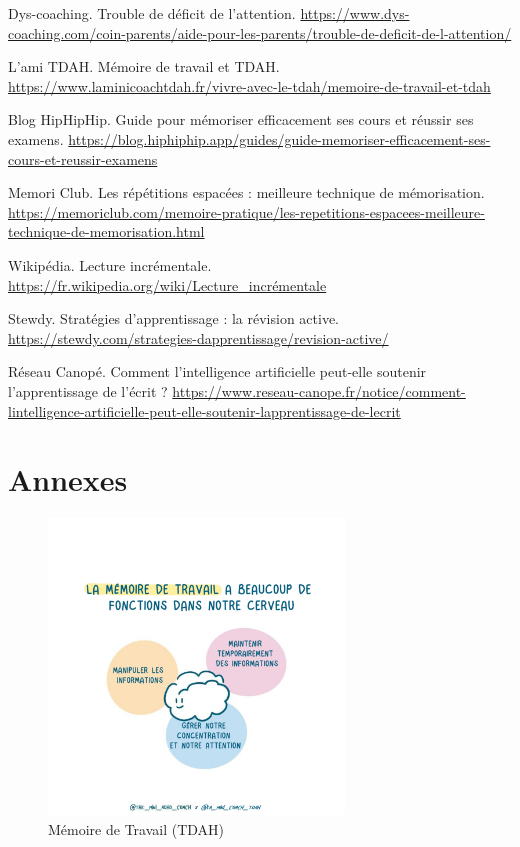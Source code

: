 \documentclass[11pt,a4paper]{report}
\begin{document}
\begin{thebibliography}{9}
        Dys-coaching. Trouble de déficit de l'attention. \break
        \url{https://www.dys-coaching.com/coin-parents/aide-pour-les-parents/trouble-de-deficit-de-l-attention/}

        L'ami TDAH. Mémoire de travail et TDAH. \break
    \url{https://www.laminicoachtdah.fr/vivre-avec-le-tdah/memoire-de-travail-et-tdah}

        Blog HipHipHip. Guide pour mémoriser efficacement ses cours et réussir ses examens. \break
    \url{https://blog.hiphiphip.app/guides/guide-memoriser-efficacement-ses-cours-et-reussir-examens}

        Memori Club. Les répétitions espacées : meilleure technique de mémorisation. \break
    \url{https://memoriclub.com/memoire-pratique/les-repetitions-espacees-meilleure-technique-de-memorisation.html}

        Wikipédia. Lecture incrémentale. \break
    \url{https://fr.wikipedia.org/wiki/Lecture_incrémentale}

        Stewdy. Stratégies d'apprentissage : la révision active. \break
    \url{https://stewdy.com/strategies-dapprentissage/revision-active/}

        Réseau Canopé. Comment l'intelligence artificielle peut-elle soutenir l'apprentissage de l'écrit ? \break
    \url{https://www.reseau-canope.fr/notice/comment-lintelligence-artificielle-peut-elle-soutenir-lapprentissage-de-lecrit}
    
\end{thebibliography}

\chapter*{Annexes}

\begin{figure}[h]
    \centering
    \includegraphics[width=0.7\textwidth]{images/ADHD-Working-Memory.png}
    \caption{Mémoire de Travail (TDAH)}
    \label{fig:tdah}
\end{figure}
\end{document}
